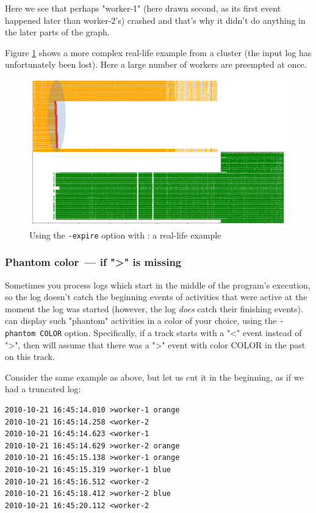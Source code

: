 \documentclass{article}
\begin{document}
Here we see that perhaps "worker-1" (here drawn second, as its first event happened later than worker-2's) crashed and that's why it didn't do anything in the later parts of the graph.

Figure \ref{fig:splot-expire-large-example} shows a more complex real-life example from a cluster (the input log has unfortunately been lost). Here a large number of workers are preempted at once.

\begin{figure}
\center
\includegraphics[width=\textwidth]{pics/splot/splot-expire-large-example.png}
\caption{Using the \texttt{-expire} option with \splot{}: a real-life example}
\label{fig:splot-expire-large-example}
\end{figure}

\subsubsection{Phantom color~--- if ">" is missing}

Sometimes you process logs which start in the middle of the program's execution, so the log doesn't catch the beginning events of activities that were active at the moment the log was started (however, the log \emph{does} catch their finishing events). \splot{} can display such "phantom" activities in a color of your choice, using the \verb|-phantom COLOR| option. Specifically, if a track starts with a "<" event instead of ">", then \splot{} will assume that there was a ">" event with color COLOR in the past on this track.

Consider the same example as above, but let us cut it in the beginning, as if we had a truncated log:

\begin{verbatim}
2010-10-21 16:45:14.010 >worker-1 orange
2010-10-21 16:45:14.258 <worker-2
2010-10-21 16:45:14.623 <worker-1
2010-10-21 16:45:14.629 >worker-2 orange
2010-10-21 16:45:15.138 >worker-1 orange
2010-10-21 16:45:15.319 >worker-1 blue
2010-10-21 16:45:16.512 <worker-2
2010-10-21 16:45:18.412 >worker-2 blue
2010-10-21 16:45:20.112 <worker-2
\end{verbatim}
\end{document}
